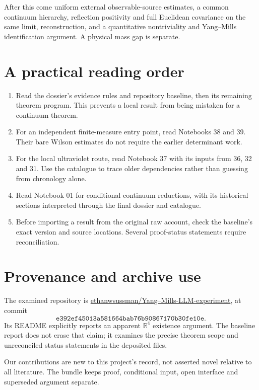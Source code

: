 \documentclass[11pt]{article}
\theoremstyle{remark}
\begin{document}
After this come uniform external
observable-source estimates, a common
continuum hierarchy, reflection positivity
and full Euclidean covariance on the
same limit, reconstruction, and a
quantitative nontriviality and
Yang--Mills identification argument.
A physical mass gap is separate.

\section*{A practical reading order}

\begin{enumerate}
\item Read the dossier's evidence rules and
repository baseline, then its remaining
theorem program. This prevents a local
result from being mistaken for a
continuum theorem.
\item For an independent finite-measure
entry point, read Notebooks 38 and 39.
Their bare Wilson estimates do not
require the earlier determinant work.
\item For the local ultraviolet route,
read Notebook 37 with its inputs from
36, 32 and 31. Use the catalogue to
trace older dependencies rather than
guessing from chronology alone.
\item Read Notebook 01 for conditional
continuum reductions, with its
historical sections interpreted through
the final dossier and catalogue.
\item Before importing a result from
the original raw account, check the
baseline's exact version and source
locations. Several proof-status
statements require reconciliation.
\end{enumerate}

\section*{Provenance and archive use}

The examined repository is
\href{https://github.com/ethanwsussman/Yang--Mills-LLM-experiment}
{ethanwsussman/Yang--Mills-LLM-experiment},
at commit
\[
 \texttt{e392ef45013a581664bab76b90867170b30fe10e}.
\]
Its README explicitly reports an apparent
\(\mathbb R^4\) existence argument. The
baseline report does not erase that
claim; it examines the precise theorem
scope and unreconciled status statements
in the deposited files.

Our contributions are new to this
project's record, not asserted novel
relative to all literature. The bundle
keeps proof, conditional input, open
interface and superseded argument
separate.
\end{document}
